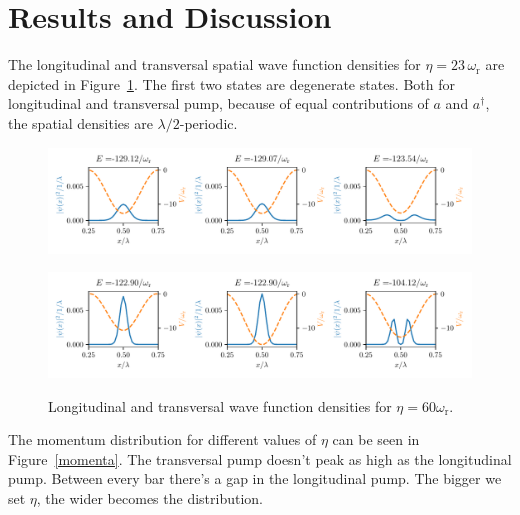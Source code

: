\section{Results and Discussion}

The longitudinal and transversal spatial wave function densities for $\eta = 23 \, \omega_\text{r}$ are depicted in Figure~\ref{densities}. The first two states are degenerate states. Both for longitudinal and transversal pump, because of equal contributions of $a$ and $a^\dagger$, the spatial densities are $\lambda / 2$-periodic.

\begin{figure}[!htb]
	\begin{minipage}[b]{1\linewidth}
	\centering
	\includegraphics[width=1\textwidth]{images/dens_long.pdf}
	\label{long_density}
	\end{minipage}
%
	\begin{minipage}[b]{1\linewidth}
	\centering
	\includegraphics[width=1\textwidth]{images/dens_trans.pdf}
	\label{trans_density}
	\end{minipage}
\caption{Longitudinal and transversal wave function densities for $\eta = 60 \omega_\text{r}$.}
\label{densities}
\end{figure}
\FloatBarrier

\noindent The momentum distribution for different values of $\eta$ can be seen in Figure~\ref{momenta}. The transversal pump doesn't peak as high as the longitudinal pump. Between every bar there's a gap in the longitudinal pump. The bigger we set $\eta$, the wider becomes the distribution.

